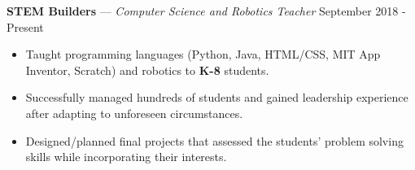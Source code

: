 \documentclass[11pt]{res}
\begin{document}
\begin{footnotesize}
\begin{resume}
\begin{itemize}
\end{itemize}
\vspace{-2.5mm}
\textbf{STEM Builders} — {\sl Computer Science and Robotics Teacher} \hfill September 2018 - Present\vspace{-5mm}
\begin{itemize}[leftmargin=6.25mm] \itemsep -2pt 
\item Taught programming languages (Python, Java, HTML/CSS, MIT App Inventor, Scratch) and robotics to \textbf{K-8} students. 
\vspace{1mm}
\item Successfully managed hundreds of students and gained leadership experience after adapting to unforeseen circumstances. 
\vspace{1mm}
\item Designed/planned final projects that assessed the students' problem solving skills while incorporating their interests.
\end{itemize}
\begin{small}

\end{small}
\end{resume}
\end{footnotesize}
\end{document}
